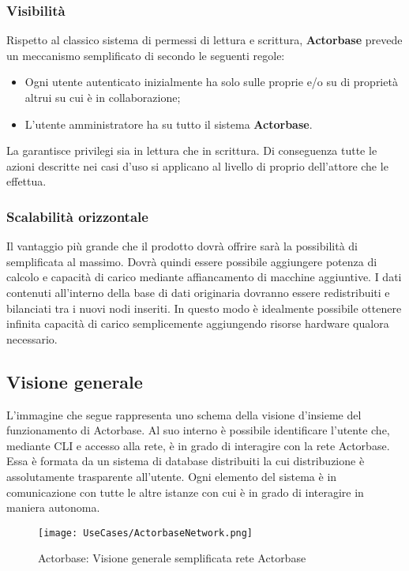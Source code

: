 \documentclass{scalatekids-article}
\begin{document}
\subsubsection{Visibilità}
\label{sec:visibilità}

Rispetto al classico sistema di permessi di lettura e scrittura, \textbf{Actorbase}
prevede un meccanismo semplificato di  secondo le seguenti regole:
\begin{itemize}
\item Ogni utente autenticato inizialmente ha  solo sulle proprie  e/o su  di proprietà altrui su cui è in collaborazione;
\item L'utente amministratore ha  su tutto il sistema \textbf{Actorbase}.
\end{itemize}
La  garantisce privilegi sia in lettura che in scrittura. Di
conseguenza tutte le azioni descritte nei casi d'uso si applicano al livello di
 proprio dell'attore che le effettua.

\subsubsection{Scalabilità orizzontale}

Il vantaggio più grande che il prodotto dovrà offrire sarà la possibilità di
 semplificata al massimo. Dovrà quindi essere possibile
aggiungere potenza di calcolo e capacità di carico mediante affiancamento di
macchine aggiuntive. I dati contenuti all'interno della base di dati originaria
dovranno essere redistribuiti e bilanciati tra i nuovi nodi inseriti. In questo
modo è idealmente possibile ottenere infinita capacità di carico semplicemente
aggiungendo risorse hardware qualora necessario.

\subsection{Visione generale}

L'immagine che segue rappresenta uno schema della visione d'insieme del funzionamento di Actorbase. Al suo interno è possibile identificare
l'utente che, mediante CLI e accesso alla rete, è in grado di interagire con la rete Actorbase. Essa è formata da un sistema di database distribuiti la cui distribuzione è assolutamente trasparente all'utente. Ogni elemento del sistema è in comunicazione con tutte le altre istanze con cui è in grado di interagire in maniera autonoma.
\begin{figure}[H]
  \begin{center}
    \texttt{[image: UseCases/ActorbaseNetwork.png]}
    \caption*{Actorbase: Visione generale semplificata rete Actorbase}
  \end{center}
\end{figure}
\end{document}
